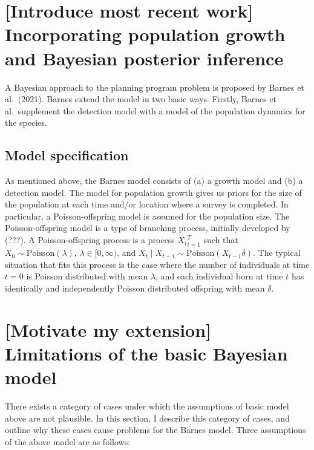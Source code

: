 \documentclass[
]{book}
\begin{document}
\hypertarget{introduce-most-recent-work-incorporating-population-growth-and-bayesian-posterior-inference}{%
\section{{[}Introduce most recent work{]} Incorporating population growth and Bayesian posterior inference}\label{introduce-most-recent-work-incorporating-population-growth-and-bayesian-posterior-inference}}

A Bayesian approach to the planning program problem is proposed by Barnes et al.~(2021). Barnes extend the model in two basic ways. Firstly, Barnes et al.~supplement the detection model with a model of the population dynamics for the species.

\hypertarget{model-specification}{%
\subsection{Model specification}\label{model-specification}}

As mentioned above, the Barnes model consists of (a) a growth model and (b) a detection model. The model for population growth gives us priors for the size of the population at each time and/or location where a survey is completed. In particular, a Poisson-offspring model is assumed for the population size. The Poisson-offspring model is a type of branching process, initially developed by (???). A Poisson-offspring process is a process \({X_t}_{t=1}^T\) such that \(X_0 \sim \mathrm{Poisson}(\lambda)\), \(\lambda \in [0, \infty)\), and \(X_t \mid X_{t-1} \sim \mathrm{Poisson}(X_{t-1} \delta)\). The typical situation that fits this process is the case where the number of individuals at time \(t=0\) is Poisson distributed with mean \(\lambda\), and each individual born at time \(t\) has identically and independently Poisson distributed offspring with mean \(\delta\).

\hypertarget{motivate-my-extension-limitations-of-the-basic-bayesian-model}{%
\section{{[}Motivate my extension{]} Limitations of the basic Bayesian model}\label{motivate-my-extension-limitations-of-the-basic-bayesian-model}}

There exists a category of cases under which the assumptions of basic model above are not plausible. In this section, I describe this category of cases, and outline why these cases cause problems for the Barnes model. Three assumptions of the above model are as follows:
\end{document}
